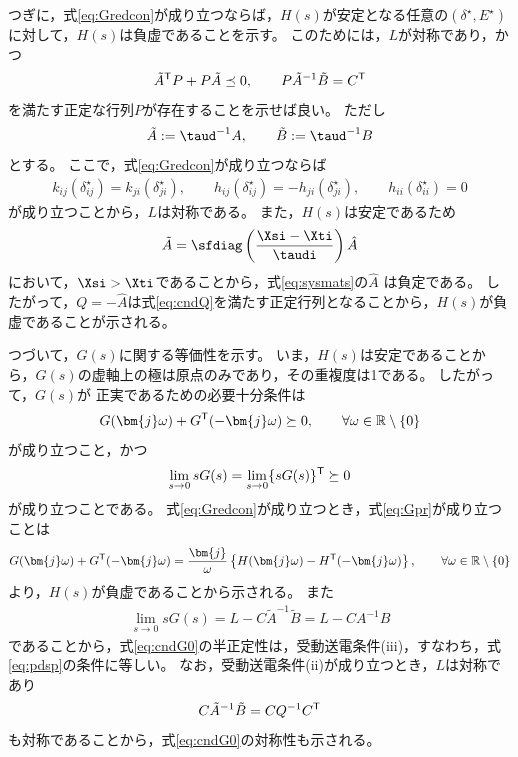 \documentclass[tombow,dvipdfmx]{corona-a5-1.1}
\begin{document}
\begin{証明}
つぎに，式\ref{eq:Gredcon}が成り立つならば，$H(s)$が安定となる任意の$(\delta^{\star},E^{\star})$に対して，$H(s)$は負虚であることを示す。
このためには，$L$が対称であり，かつ
\begin{align}\label{eq:cndQ}
\tilde{A}^{\sf T}P + P\tilde{A} \preceq 0
,\qquad
P\tilde{A}^{-1}\tilde{B}=C^{\sf T}
\end{align}
を満たす正定な行列$P$が存在することを示せば良い。
ただし
\begin{align*}
\tilde{A}:= \taud^{-1}A
,\qquad
\tilde{B}:= \taud^{-1}B
\end{align*}
とする。
ここで，式\ref{eq:Gredcon}が成り立つならば
\begin{align*}
k_{ij}(\delta_{ij}^{\star}) =
k_{ji}(\delta_{ji}^{\star})
,\qquad
h_{ij}(\delta_{ij}^{\star}) = 
- h_{ji}(\delta_{ji}^{\star}),\qquad
h_{ii}(\delta_{ii}^{\star}) = 0
\end{align*}
が成り立つことから，$L$は対称である。
また，$H(s)$は安定であるため
\begin{align*}
\tilde{A} = 
\sfdiag \left( \frac{ \Xsi -  \Xti }{ \taudi } \right)
\hat{A}
\end{align*}
において，$\Xsi > \Xti$であることから，式\ref{eq:sysmats}の$\hat{A}$
は負定である。
したがって，$Q=-\hat{A}$は式\ref{eq:cndQ}を満たす正定行列となることから，$H(s)$が負虚であることが示される。


つづいて，$G(s)$に関する等価性を示す。
いま，$H(s)$は安定であることから，$G(s)$の虚軸上の極は原点のみであり，その重複度は1である。
したがって，$G(s)$が
正実であるための必要十分条件は
\begin{align}\label{eq:Gpr}
G(\bm{j}\omega) + G^{\sf T}(-\bm{j}\omega) \succeq 0
,\qquad \forall \omega \in \mathbb{R}\setminus\{0\}
\end{align}
が成り立つこと，かつ
\begin{align}\label{eq:cndG0}
\lim_{s\rightarrow 0} s G(s) = \lim_{s\rightarrow 0} \{ s G(s)\}^{\sf T}\succeq 0
\end{align}
が成り立つことである。
式\ref{eq:Gredcon}が成り立つとき，式\ref{eq:Gpr}が成り立つことは
\begin{align}\label{eq:NIineq}
G(\bm{j}\omega) + G^{\sf T}(-\bm{j}\omega)
=
\frac{\bm{j}}{\omega} \left\{
H(\bm{j}\omega) - H^{\sf T}(-\bm{j}\omega)
\right\}
,\qquad \forall \omega \in \mathbb{R}\setminus\{0\}
\end{align}
より，$H(s)$が負虚であることから示される。
また
\begin{align*}
\lim_{s\rightarrow 0} s G(s) =
L - C\tilde{A}^{-1}\tilde{B} = L - C A^{-1} B
\end{align*}
であることから，式\ref{eq:cndG0}の半正定性は，受動送電条件(iii)，すなわち，式\ref{eq:pdsp}の条件に等しい。
なお，受動送電条件(ii)が成り立つとき，$L$は対称であり
\begin{align*}
C\tilde{A}^{-1}\tilde{B} = C Q^{-1} C^{\sf T}
\end{align*}
も対称であることから，式\ref{eq:cndG0}の対称性も示される。


\end{証明}
\end{document}
